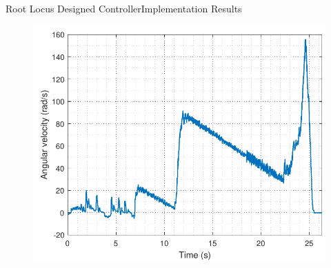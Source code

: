 \begin{frame}{Root Locus Designed Controller}{Implementation Results}
\begin{minipage}{\linewidth}
\begin{minipage}{0.45\linewidth}
\begin{figure}[H]
			\includegraphics[scale=.35]{Pictures/wheelRLTest}
			\centering
		\end{figure}
	\end{minipage}
\end{minipage}
\end{frame}
